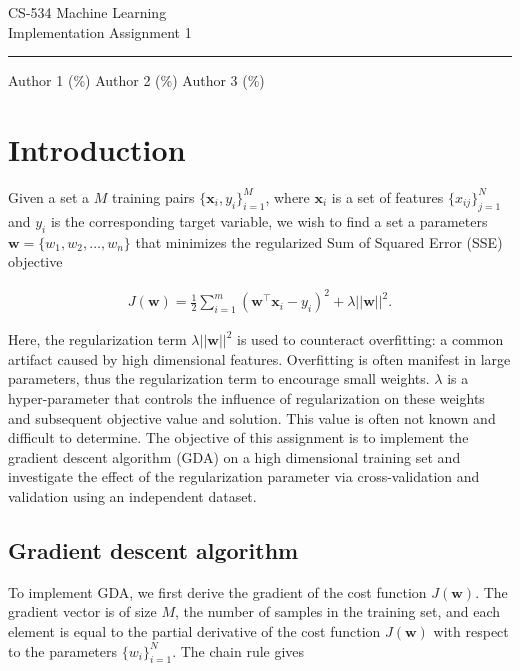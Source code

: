 \documentclass{article}
\renewcommand{\vec}[1]{\mathbf{#1}}
\begin{document}
\begin{center}
	{\huge CS-534 Machine Learning} \\ \vspace{2mm}
	{\Large Implementation Assignment 1} \\ \vspace{2mm} \hrule \vspace{3mm}
	{\normalsize Author 1 (\%) \hspace{6mm}  Author 2 (\%) \hspace{6mm}  Author 3 (\%)} 
\end{center}

\section{Introduction}

Given a set a $M$ training pairs $\{\vec{x}_i, y_i\}^M_{i=1}$, where $\vec{x}_i$ is a set of features $\{x_{ij}\}^N_{j=1}$ and $y_i$ is the corresponding target variable, we wish to find a set a parameters $\vec{w} = \{w_1, w_2, \dots ,w_n\}$ that minimizes the regularized Sum of Squared Error (SSE) objective

\begin{align*}
	J(\vec{w}) = \frac{1}{2}\sum^{m}_{i=1}(\vec{w}^\top\vec{x}_i - y_i)^2 + \lambda||\vec{w}||^2.
\end{align*}

Here, the regularization term $\lambda||\vec{w}||^2$ is used to counteract overfitting: a common artifact caused by high dimensional features. Overfitting is often manifest in large parameters, thus the regularization term to encourage small weights. $\lambda$ is a hyper-parameter that controls the influence of regularization on these weights and subsequent objective value and solution. This value is often not known and difficult to determine. The objective of this assignment is to implement the gradient descent algorithm (GDA) on a high dimensional training set and investigate the effect of the regularization parameter via cross-validation and validation using an independent dataset.

\subsection{Gradient descent algorithm}

To implement GDA, we first derive the gradient of the cost function $J(\vec{w})$. The gradient vector is of size $M$, the number of samples in the training set, and each element is equal to the partial derivative of the cost function $J(\vec{w})$ with respect to the parameters $\{w_i\}^N_{i=1}$. The chain rule gives
\end{document}
